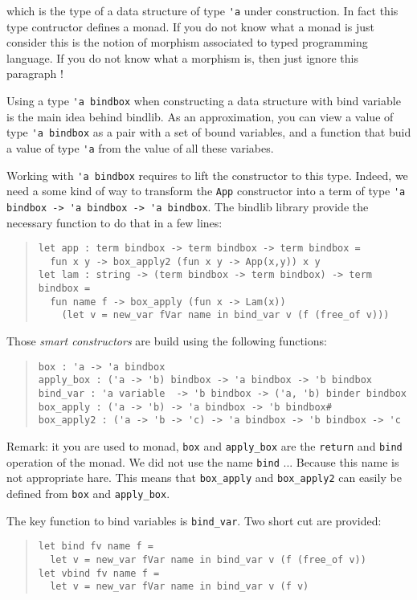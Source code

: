 \documentclass[11pt]{article}
\begin{document}
which is the type of a data structure of type \verb#'a# under
construction.
In fact this type contructor defines a monad. If you do not know what
a monad is just consider this is the notion of morphism associated to
typed programming language. If you do not know what a morphism is,
then just ignore this paragraph !

Using a type \verb!'a bindbox! when constructing a data structure with
bind variable is the main idea behind bindlib. As an approximation,
you can view a value of type \verb!'a bindbox! as a pair with a set
of bound variables, and a function that buid a value of type \verb!'a!
from the value of all these variabes.

Working with \verb!'a bindbox! requires to lift the constructor to
this type. Indeed, we need a some kind of way to transform the
\verb!App! constructor into a term of type
\verb!'a bindbox -> 'a bindbox -> 'a bindbox!. The bindlib library
provide the necessary function to do that in a few lines:

\begin{quote}
\begin{verbatim}
let app : term bindbox -> term bindbox -> term bindbox =
  fun x y -> box_apply2 (fun x y -> App(x,y)) x y
let lam : string -> (term bindbox -> term bindbox) -> term bindbox =
  fun name f -> box_apply (fun x -> Lam(x))
    (let v = new_var fVar name in bind_var v (f (free_of v)))
\end{verbatim}
\end{quote}

Those \emph{smart constructors} are build using the following functions:
\begin{quote}
\begin{verbatim}
box : 'a -> 'a bindbox
apply_box : ('a -> 'b) bindbox -> 'a bindbox -> 'b bindbox
bind_var : 'a variable  -> 'b bindbox -> ('a, 'b) binder bindbox
box_apply : ('a -> 'b) -> 'a bindbox -> 'b bindbox#
box_apply2 : ('a -> 'b -> 'c) -> 'a bindbox -> 'b bindbox -> 'c
\end{verbatim}
\end{quote}

Remark: it you are used to monad, \verb#box# and \verb#apply_box# are
the \verb#return# and \verb#bind# operation of the monad. We did not
use the name \verb#bind# ... Because this name is not appropriate
hare. This means that \verb#box_apply# and \verb#box_apply2# can
easily be defined from \verb#box# and \verb#apply_box#.

The key function to bind variables is \verb#bind_var#. Two short cut
are provided:
\begin{quote}
\begin{verbatim}
let bind fv name f =
  let v = new_var fVar name in bind_var v (f (free_of v))
let vbind fv name f =
  let v = new_var fVar name in bind_var v (f v)
\end{verbatim}
\end{quote}
\end{document}
